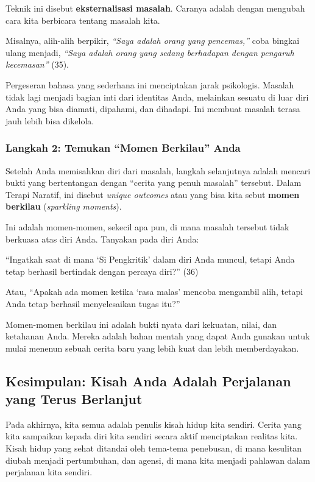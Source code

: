 \documentclass[
  letterpaper,
  DIV=11,
  numbers=noendperiod]{scrreprt}
\begin{document}
Teknik ini disebut \textbf{eksternalisasi masalah}. Caranya adalah
dengan mengubah cara kita berbicara tentang masalah kita.

Misalnya, alih-alih berpikir, \emph{``Saya adalah orang yang
pencemas,''} coba bingkai ulang menjadi, \emph{``Saya adalah orang yang
sedang berhadapan dengan pengaruh kecemasan''} (35).

Pergeseran bahasa yang sederhana ini menciptakan jarak psikologis.
Masalah tidak lagi menjadi bagian inti dari identitas Anda, melainkan
sesuatu di luar diri Anda yang bisa diamati, dipahami, dan dihadapi. Ini
membuat masalah terasa jauh lebih bisa dikelola.

\subsubsection{Langkah 2: Temukan ``Momen Berkilau''
Anda}\label{langkah-2-temukan-momen-berkilau-anda}

Setelah Anda memisahkan diri dari masalah, langkah selanjutnya adalah
mencari bukti yang bertentangan dengan ``cerita yang penuh masalah''
tersebut. Dalam Terapi Naratif, ini disebut \emph{unique outcomes} atau
yang bisa kita sebut \textbf{momen berkilau} (\emph{sparkling moments}).

Ini adalah momen-momen, sekecil apa pun, di mana masalah tersebut tidak
berkuasa atas diri Anda. Tanyakan pada diri Anda:

``Ingatkah saat di mana `Si Pengkritik' dalam diri Anda muncul, tetapi
Anda tetap berhasil bertindak dengan percaya diri?'' (36)

Atau, ``Apakah ada momen ketika `rasa malas' mencoba mengambil alih,
tetapi Anda tetap berhasil menyelesaikan tugas itu?''

Momen-momen berkilau ini adalah bukti nyata dari kekuatan, nilai, dan
ketahanan Anda. Mereka adalah bahan mentah yang dapat Anda gunakan untuk
mulai menenun sebuah cerita baru yang lebih kuat dan lebih
memberdayakan.

\subsection{\texorpdfstring{\textbf{Kesimpulan: Kisah Anda Adalah
Perjalanan yang Terus
Berlanjut}}{Kesimpulan: Kisah Anda Adalah Perjalanan yang Terus Berlanjut}}\label{kesimpulan-kisah-anda-adalah-perjalanan-yang-terus-berlanjut}

Pada akhirnya, kita semua adalah penulis kisah hidup kita sendiri.
Cerita yang kita sampaikan kepada diri kita sendiri secara aktif
menciptakan realitas kita. Kisah hidup yang sehat ditandai oleh
tema-tema penebusan, di mana kesulitan diubah menjadi pertumbuhan, dan
agensi, di mana kita menjadi pahlawan dalam perjalanan kita sendiri.
\end{document}
